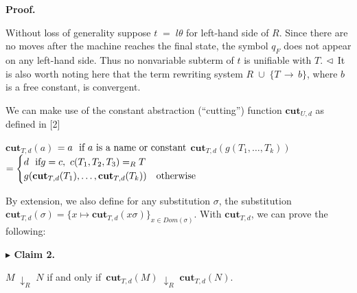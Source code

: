 \par\medskip\noindent\textbf{Proof.}\par
 
 
Without loss of generality suppose $t\;=\;l\theta$ for left-hand side of $R$. Since there are no moves after the machine reaches the final state, the symbol $q_{F}$ does not appear on any left-hand side. Thus no nonvariable subterm of $t$ is unifiable with $T$. $\hfill\vartriangleleft$ It is also worth noting here that the term rewriting system $R\;\cup\;\{T\,\rightarrow\,b\}$, where $b$ is a free constant, is convergent.\par
 
 
 
We can make use of the constant abstraction (“cutting”) function $\mathbf{cut}_{U,d}$ as defined in [2]\par
    $\displaystyle\mathbf{cut}_{T,d}(a)$ $\displaystyle=a\leavevmode\nobreak\ \text{ if $a$ is a name or constant}$     $\displaystyle\mathbf{cut}_{T,d}(g(T_{1},\ldots,T_{k}))$ $\displaystyle=\begin{cases}d\leavevmode\nobreak\ \leavevmode\nobreak\ \text{if%
 }g=c,\leavevmode\nobreak\ c(T_{1},T_{2},T_{3})=_{R}T\\
g(\mathbf{cut}_{T,d}(T_{1}),\ldots,\mathbf{cut}_{T,d}(T_{k}))&\text{otherwise %
}\end{cases}$    
 
 
By extension, we also define for any substitution $\sigma$, the substitution $\mathbf{cut}_{T,d}(\sigma)=\{x\mapsto\mathbf{cut}_{T,d}(x\sigma)\}_{x\in Dom(%
\sigma)}$. With $\mathbf{cut}_{T,d}$, we can prove the following:\par
 
 
 
\par\medskip\noindent\textbf{$\blacktriangleright$ Claim 2.}\par
 
 
$M\;\downarrow_{R}\;N$ if and only if $\,\mathbf{cut}_{T,d}(M)\;\downarrow_{R}\;\mathbf{cut}_{T,d}(N)$.\par
 
